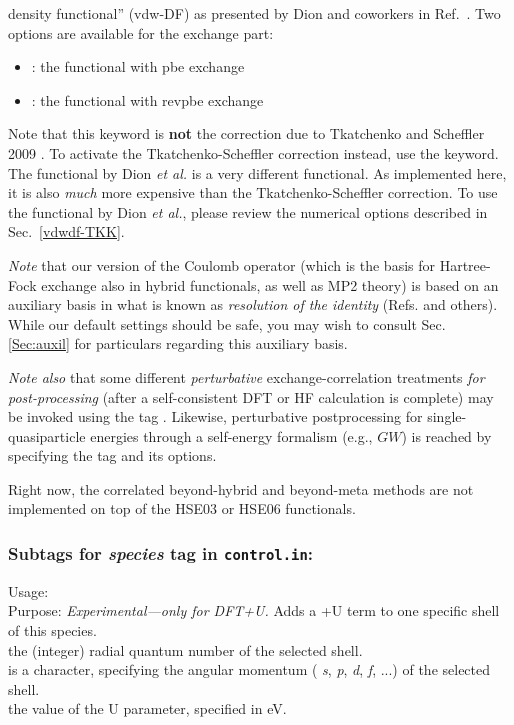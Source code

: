 \begin{itemize}
    density functional'' (vdw-DF) as presented by Dion and coworkers
    in Ref.~\cite{Dion04}. Two options are available for the exchange
    part:  
    \begin{itemize}
      \item {} : the functional with pbe exchange
      \item {} : the functional with revpbe exchange
    \end{itemize}
    Note that this keyword is \textbf{not} the correction due to
    Tkatchenko and Scheffler 2009 \cite{TS-vdw}. To activate the
    Tkatchenko-Scheffler correction instead, use the
     keyword. The functional by
    Dion \emph{et al.} is a very different functional. As implemented
    here, it is also \emph{much} more expensive than the
    Tkatchenko-Scheffler correction. To use the functional by Dion
    \emph{et al.}, please review the numerical options described in
    Sec.~\ref{vdwdf-TKK}. 
\end{itemize}
\emph{Note} that our version of the Coulomb operator (which is the basis for
Hartree-Fock exchange also in hybrid functionals, as well as MP2 theory) is
based on an auxiliary basis in what is known as \emph{resolution of the
  identity} (Refs. \cite{Boys59,Alsenoy88,Vahtras93,Eichkorn95} and
others). While our default settings should be safe, you may
wish to consult Sec. \ref{Sec:auxil} for particulars regarding this auxiliary
basis.

\emph{Note also} that some different \emph{perturbative} exchange-correlation
treatments \emph{for post-processing} (after a self-consistent DFT or HF
calculation is complete) may be invoked using the tag
. Likewise, perturbative postprocessing for
single-quasiparticle energies through a self-energy formalism (e.g., $GW$) is
reached by specifying the  tag and its options.

Right now, the correlated beyond-hybrid and beyond-meta methods are not
implemented on top of the HSE03 or HSE06 functionals.



\subsubsection*{Subtags for \emph{species} tag in \texttt{control.in}:}

{
  \noindent
  Usage:     \\[1.0ex]
  Purpose: \emph{Experimental---only for DFT+U.} Adds a +U term to one
    specific shell of this species. \\[1.0ex] 
   the (integer) radial quantum number of the selected shell. \\
   is a character, specifying the angular momentum (
    \emph{s}, \emph{p}, \emph{d}, \emph{f}, ...) of the selected shell. \\
   the value of the U parameter, specified in eV. \\
}


